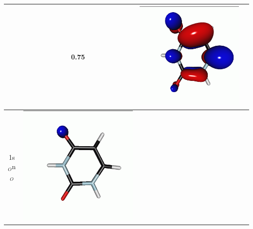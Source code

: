 \documentclass[journal=jctcce,manuscript=article]{achemso}
\begin{document}
\begin{table}[H]
\begin{tabular}{ c | c c c }
\begin{minipage}{0.2\textwidth}
    \end{minipage}
    & 0.75
    &  \begin{minipage}{0.2\textwidth}
        \centering
        \includegraphics[scale=0.10]{NTO/Uracil/S0toS2p.png}
    \end{minipage}
\\\hline
1s$_O$n$_O$ &  
    \begin{minipage}{0.2\textwidth}
        \centering
        \includegraphics[scale=0.10]{NTO/Uracil/S1toCVSh.png}

\end{minipage}
\end{tabular}
\end{table}
\end{document}
